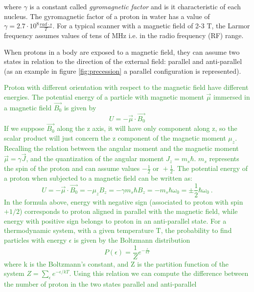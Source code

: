\documentclass[11pt]{report}
\begin{document}
where  $\gamma$ is a constant called \emph{gyromagnetic factor} and is it characteristic of each nucleus.
The gyromagnetic factor of a proton in water has a value of $\gamma = 2.7\cdot 10^8 \frac{rad\cdot s}{T}$.
For a typical scanner with a magnetic field of 2-3 T, the Larmor frequency assumes values of tens of MHz i.e. in the radio frequency (RF) range.

When protons in a body are exposed to a magnetic field, they can assume two states in relation to the direction of the external field: parallel and anti-parallel (as an example in figure \ref{fig:precession} a parallel configuration is represented).

\textcolor{ForestGreen}{
Proton with different orientation with respect to the magnetic field have different energies.
The potential energy of a particle with magnetic moment $\vec{\mu}$ immersed in a magnetic field $\vec{B_0}$ is given by
\begin{equation}
U = -  \vec{\mu} \cdot \vec{B_0}
\end{equation}
If we suppose $\vec{B_0}$ along the z axis, it will have only component along z, so the scalar product will just concern the z component of the magnetic moment $\mu_z$.
Recalling the relation between the angular moment and the magnetic moment $\vec{\mu} = \gamma \vec{J}$, and the quantization of the angular moment $J_z = m_s \hbar$.
$m_s$ represents the spin of the proton and can assume values $-\frac{1}{2} \text{ or } +\frac{1}{2}$.
The potential energy of a proton when subjected to a magnetic field can be written as:
\begin{equation}
U = -\vec{\mu} \cdot \vec{B_0} = - \mu_z B_z = - \gamma m_s \hbar B_z = - m_s \hbar \omega_0 = \pm \frac{1}{2} \hbar \omega_0 \ .
\end{equation}
In the formula above, energy with negative sign (associated to proton with spin $+1/2$) corresponds to proton aligned in parallel with the magnetic field, while energy with positive sign belongs to proton in an anti-parallel state.
For a thermodynamic system, with a given temperature T, the probability to find particles with energy $\epsilon$ is given by the Boltzmann distribution
\begin{equation}
P(\epsilon) = \frac{1}{Z} e^{-\frac{\epsilon}{kT}}
\end{equation}
where k is the Boltzmann's constant, and Z is the partition function of the system $Z = \sum_\epsilon e^{-\epsilon/kT}$.
Using this relation we can compute the difference between the number of proton in the two states parallel and anti-parallel
}
\end{document}
